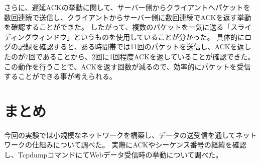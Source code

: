 \documentclass[twocolumn]{jsarticle}
\begin{document}
さらに、遅延ACKの挙動に関して、サーバー側からクライアントへパケットを数回連続で送信し、クライアントからサーバー側に数回連続でACKを返す挙動を確認することができた。
したがって、複数のパケットを一気に送る「スライディングウィンドウ」というものを使用していることが分かった。
具体的にログの記録を確認すると、ある時間帯では11回のパケットを送信し、ACKを返したのが7回であることから、2回に1回程度ACKを返していることが確認できた。
この動作を行うことで、ACKを返す回数が減るので、効率的にパケットを受信することができる事が考えられる。


\section{まとめ}
今回の実験では小規模なネットワークを構築し、データの送受信を通してネットワークの仕組みについて調べた。
実際にACKやシーケンス番号の経緯を確認し、TcpdumpコマンドにてWebデータ受信時の挙動について調べた。
\end{document}
